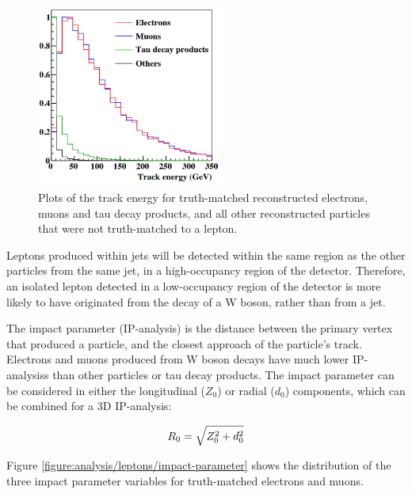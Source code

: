 \begin{figure}[t]
	\centering
	\includegraphics[width=0.55\textwidth]{../Pictures/Analysis/track-energy.png}
	\caption{Plots of the track energy for truth-matched reconstructed electrons, muons and tau decay products, and all other reconstructed particles that were not truth-matched to a lepton.}
	\label{figure:analysis/leptons/track-energy}
\end{figure}

Leptons produced within jets will be detected within the same region as the other particles from the same jet, in a high-occupancy region of the detector. Therefore, an isolated lepton detected in a low-occupancy region of the detector is more likely to have originated from the decay of a W boson, rather than from a jet.

The impact parameter (\acrshort{IP-analysis}) is the distance between the primary vertex that produced a particle, and the closest approach of the particle's track. Electrons and muons produced from W boson decays have much lower \acrshort{IP-analysis}s than other particles or tau decay products. The impact parameter can be considered in either the longitudinal ($Z_0$) or radial ($d_0$) components, which can be combined for a 3D \acrshort{IP-analysis}:

\begin{equation}
	\centering
	R_0 = \sqrt{Z_0^2 + d_0^2}
\label{eq:impact-parameter}
\end{equation}

Figure \ref{figure:analysis/leptons/impact-parameter} shows the distribution of the three impact parameter variables for truth-matched electrons and muons.

